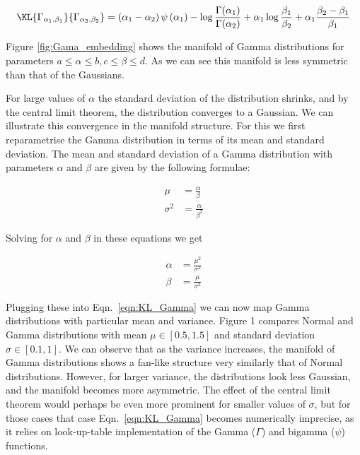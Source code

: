 \begin{equation}
	\KL{\Gamma_{\alpha_1,\beta_1}}{\Gamma_{\alpha_2,\beta_2}} = \left(\alpha_1 - \alpha_2\right)\psi\left(\alpha_1\right) - \log\frac{\Gamma(\alpha_1)}{\Gamma(\alpha_2)} + \alpha_1\log\frac{\beta_1}{\beta_2} + \alpha_1\frac{\beta_2 - \beta_1}{\beta_1} \label{eqn:KL_Gamma}
\end{equation}

Figure \ref{fig:Gama_embedding} shows the manifold of Gamma distributions for parameters $a \leq \alpha \leq b, c\leq \beta \leq d$. As we can see this manifold is less symmetric than that of the Gaussians.

For large values of $\alpha$ the standard deviation of the distribution shrinks, and by the central limit theorem, the distribution converges to a Gaussian. We can illustrate this convergence in the manifold structure. For this we first reparametrise the Gamma distribution in terms of its mean and standard deviation. The mean and standard deviation of a Gamma distribution with parameters $\alpha$ and $\beta$ are given by the following formulae:

\begin{align}
	\mu &= \frac{\alpha}{\beta}\\
	\sigma^2 &= \frac{\alpha}{\beta^2}
\end{align}

Solving for $\alpha$ and $\beta$ in these equations we get

\begin{align}
	\alpha &= \frac{\mu^2}{\sigma^2}\\
	\beta &= \frac{\mu}{\sigma^2}
\end{align}

Plugging these into Eqn.\ \eqref{eqn:KL_Gamma} we can now map Gamma distributions with particular mean and variance. Figure 1 compares Normal and Gamma distributions with mean $\mu\in[0.5,1.5]$ and standard deviation $\sigma\in[0.1,1]$. We can observe that as the variance increases, the manifold of Gamma distributions shows a fan-like structure very similarly that of Normal distributions. However, for larger variance, the distributions look less Gaussian, and the manifold becomes more asymmetric. The effect of the central limit theorem would perhaps be even more prominent for smaller values of $\sigma$, but for those cases that case Eqn.\ \eqref{eqn:KL_Gamma} becomes numerically imprecise, as it relies on look-up-table implementation of the Gamma ($\Gamma$) and bigamma ($\psi$) functions.

